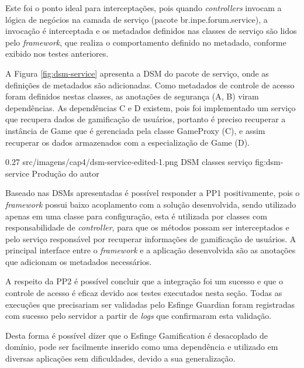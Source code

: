 \par Este foi o ponto ideal para interceptações, pois quando \textit{controllers} invocam a lógica de negócios na camada de serviço (pacote br.inpe.forum.service), a invocação é interceptada e os metadados definidos nas classes de serviço são lidos pelo \textit{framework}, que realiza o comportamento definido no metadado, conforme exibido nos testes anteriores.

\par A Figura \ref{fig:dsm-service} apresenta a DSM do pacote de serviço, onde as definições de metadados são adicionadas. Como metadados de controle de acesso foram definidos nestas classes, as anotações de segurança (A, B) viram dependências. As dependências C e D existem, pois foi implementado um serviço que recupera dados de gamificação de usuários, portanto é preciso recuperar a instância de Game que é gerenciada pela classe GameProxy (C), e assim recuperar os dados armazenados com a especialização de Game (D).

\begin{image}
{0.27}
{src/imagens/cap4/dsm-service-edited-1.png}
{DSM classes serviço}
{fig:dsm-service}
{Produção do autor}
\end{image}


\par Baseado nas DSMs apresentadas é possível responder a PP1 positivamente, pois o \textit{framework} possui baixo acoplamento com a solução desenvolvida, sendo utilizado apenas em uma classe para configuração, esta é utilizada por classes com responsabilidade de \textit{controller}, para que os métodos possam ser interceptados e pelo serviço responsável por recuperar informações de gamificação de usuários. A principal interface entre o \textit{framework} e a aplicação desenvolvida são as anotações que adicionam os metadados necessários. 
\par A respeito da PP2 é possível concluir que a integração foi um sucesso e que o controle de acesso é eficaz devido aos testes executados nesta seção. Todas as execuções que precisariam ser validadas pelo Esfinge Guardian foram registradas com sucesso pelo servidor a partir de \textit{logs} que confirmaram esta validação. 
\par Desta forma é possível dizer que o Esfinge Gamification é desacoplado de domínio, pode ser facilmente inserido como uma dependência e utilizado em diversas aplicações sem dificuldades, devido a sua generalização.